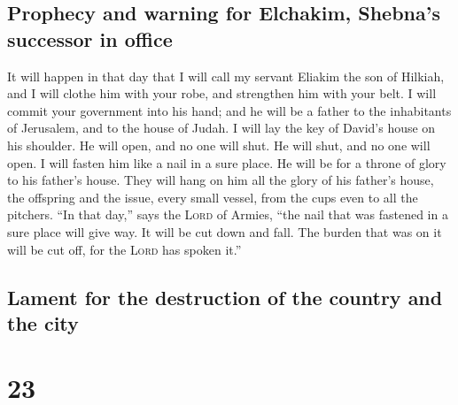 \hypertarget{prophecy-and-warning-for-elchakim-shebnas-successor-in-office}{%
\subsection{Prophecy and warning for Elchakim, Shebna's successor in
office}\label{prophecy-and-warning-for-elchakim-shebnas-successor-in-office}}

 It will happen in that day that I will call my servant
Eliakim the son of Hilkiah,  and I will clothe him with
your robe, and strengthen him with your belt. I will commit your
government into his hand; and he will be a father to the inhabitants of
Jerusalem, and to the house of Judah.  I will lay the key
of David's house on his shoulder. He will open, and no one will shut. He
will shut, and no one will open.  I will fasten him like
a nail in a sure place. He will be for a throne of glory to his father's
house.  They will hang on him all the glory of his
father's house, the offspring and the issue, every small vessel, from
the cups even to all the pitchers.  ``In that day,'' says
the \textsc{Lord} of Armies, ``the nail that was fastened in a sure
place will give way. It will be cut down and fall. The burden that was
on it will be cut off, for the \textsc{Lord} has spoken it.''

\hypertarget{lament-for-the-destruction-of-the-country-and-the-city}{%
\subsection{Lament for the destruction of the country and the
city}\label{lament-for-the-destruction-of-the-country-and-the-city}}

\hypertarget{section-22}{%
\section{23}\label{section-22}}

